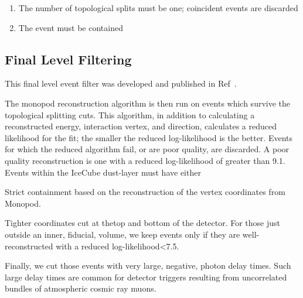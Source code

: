 \documentclass[main.tex]{subfiles}
\begin{document}
\begin{enumerate}
    \item The number of topological splits must be one; coincident events are discarded
    \item The event must be contained 
\end{enumerate}

\subsection{Final Level Filtering}

This final level event filter was developed and published in Ref~\cite{2018PhDT17N}.

The monopod reconstruction algorithm is then run on events which survive the topological splitting cuts. 
This algorithm, in addition to calculating a reconstructed energy, interaction vertex, and direction, calculates a  reduced likelihood for the fit; the smaller the reduced log-likelihood is the better. 
Events for which the reduced algorithm fail, or are poor quality, are discarded. 
A poor quality reconstruction is one with a reduced log-likelihood of greater than 9.1.
Events within the IceCube dust-layer must have either 

Strict containment based on the reconstruction of the vertex coordinates from Monopod. 

Tighter coordinates cut at thetop and bottom of the detector. For those just outside an inner, fiducial, volume, we keep events only if they are well-reconstructed with a reduced log-likelihood<7.5. 

Finally, we cut those events with very large, negative, photon delay times. Such large delay times are common for detector triggers resulting from uncorrelated bundles of atmospheric cosmic ray muons. 
\end{document}
